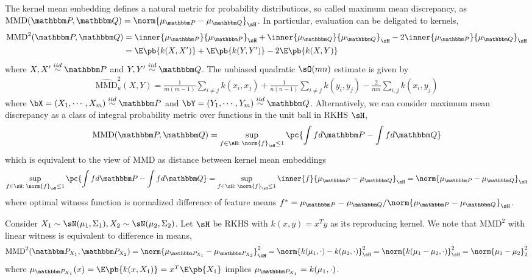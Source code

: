 \documentclass[11pt]{article}
\begin{document}
The kernel mean embedding defines a natural metric for probability distributions, so called maximum mean discrepancy, as $\text{MMD}(\bbP,\bbQ)
= \norm{\mu_{\bbP}-\mu_{\bbQ}}_{\sH}$. In particular, evaluation can be deligated to kernels, 
\begin{align}
    \text{MMD}^2(\bbP,\bbQ)
        &= \inner{\mu_{\bbP}}{\mu_{\bbP}}_{\sH} + \inner{\mu_{\bbQ}}{\mu_{\bbQ}}_{\sH} - 2\inner{\mu_{\bbP}}{\mu_{\bbQ}}_{\sH} \\
        &= \E\pb{k(X,X')} + \E\pb{k(Y,Y')} - 2\E\pb{k(X,Y)}
\end{align}
where $X,X'\overset{iid}{\sim} \bbP$ and $Y,Y'\overset{iid}{\sim} \bbQ$. The unbiased quadratic $\sO(mn)$ estimate is given by
\begin{align}
    \widehat{\text{MMD}}_u^2(X,Y)
        = \frac{1}{m(m-1)} \sum_{i\neq j} k(x_i,x_j) + \frac{1}{n(n-1)} \sum_{i\neq j} k(y_i,y_j) - \frac{2}{mn} \sum_{i,j} k(x_i,y_j)
\end{align}
where $\bX = (X_1,\cdots,X_m) \overset{iid}{\sim}\bbP$ and $\bY = (Y_1,\cdots,Y_m) \overset{iid}{\sim} \bbQ$. Alternatively, we can consider maximum mean discrepancy as a class of integral probability metric over functions in the unit ball in RKHS $\sH$,
\begin{align}
    \text{MMD}(\bbP,\bbQ)
        = \sup_{f\in\sH:\; \norm{f}_{\sH}\leq 1} \pc{
            \int f d\bbP - \int f d\bbQ
        }
\end{align}
which is equivalent to the view of MMD as distance between kernel mean embeddings
\begin{align}
    \sup_{f\in\sH:\; \norm{f}_{\sH}\leq 1} \pc{
            \int f d\bbP - \int f d\bbQ
        }
        = \sup_{f\in\sH:\; \norm{f}_{\sH}\leq 1} \inner{f}{\mu_{\bbP}-\mu_{\bbQ}}_{\sH}
        = \norm{\mu_{\bbP} - \mu_{\bbQ}}_{\sH}
\end{align}
where optimal witness function is normalized difference of feature means $f^* = \mu_{\bbP}-\mu_{\bbQ}/\norm{ \mu_{\bbP}-\mu_{\bbQ} }_{\sH}$. 

\begin{example}
    Consider $X_1\sim \sN(\mu_1,\Sigma_1), X_2\sim \sN(\mu_2,\Sigma_2)$. Let $\sH$ be RKHS with $k(x,y)=x^Ty$ as its reproducing kernel. We note that $\text{MMD}^2$ with linear witness is equivalent to difference in means,
    \begin{align}
        \text{MMD}^2(\bbP_{X_1},\bbP_{X_2})
            = \norm{\mu_{\bbP_{X_1}} - \mu_{\bbP_{X_2}}}_{\sH}^2
            = \norm{ k(\mu_1, \cdot) - k(\mu_2,\cdot) }_{\sH}^2
            = \norm{ k(\mu_1-\mu_2,\cdot) }_{\sH}^2
            = \norm{\mu_1 - \mu_2}_2^2
    \end{align}
    where $\mu_{\bbP_{X_1}}(x) = \E\pb{ k(x, X_1) } = x^T\E\pb{X_1}$ implies $\mu_{\bbP_{X_1}} = k(\mu_1, \cdot)$.
\end{example}









\newpage
\printbibliography 
\end{document}
